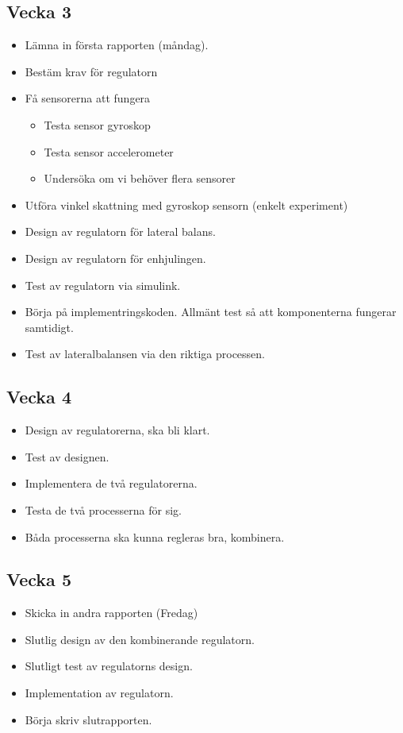 \documentclass[a4paper]{article}
\begin{document}
	

	
    
    \subsection*{Vecka 3}
    \begin{itemize}
    \item Lämna in första rapporten (måndag).
	\item Bestäm krav för regulatorn
    \item Få sensorerna att fungera
    \begin{itemize}
    	\item Testa sensor gyroskop
	\item Testa sensor accelerometer
	\item Undersöka om vi behöver flera sensorer
    \end{itemize}
    \item Utföra vinkel skattning med gyroskop sensorn (enkelt experiment)
    \item Design av regulatorn för lateral balans.
    \item Design av regulatorn för enhjulingen. 
    \item Test av regulatorn via simulink.
    \item Börja på implementringskoden. Allmänt test så att komponenterna fungerar samtidigt.
    \item Test av lateralbalansen via den riktiga processen.
	\end{itemize}
    
    \subsection*{Vecka 4}
    \begin{itemize}
	\item Design av regulatorerna, ska bli klart.
    \item Test av designen.
    \item Implementera de två regulatorerna.
    \item Testa de två processerna för sig.
    \item Båda processerna ska kunna regleras bra, kombinera.
	\end{itemize}
    
    \subsection*{Vecka 5}
    \begin{itemize}
    \item Skicka in andra rapporten (Fredag)
    \item Slutlig design av den kombinerande regulatorn.
    \item Slutligt test av regulatorns design.
	\item Implementation av regulatorn.
	\item Börja skriv slutrapporten. 
	\end{itemize}
    
\end{document}
